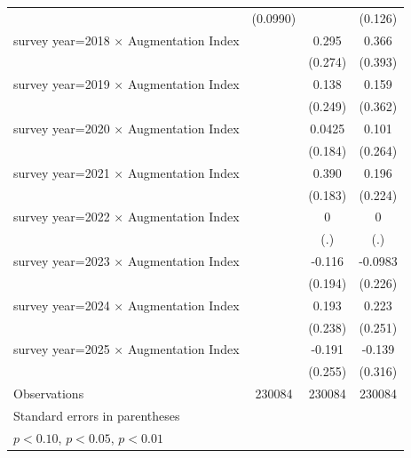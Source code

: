 \begin{table}[htbp]
\begin{tabular}{l*{3}{c}}
                    &    (0.0990)         &                     &     (0.126)         \\
\addlinespace
survey year=2018 $\times$ Augmentation Index&                     &       0.295         &       0.366         \\
                    &                     &     (0.274)         &     (0.393)         \\
\addlinespace
survey year=2019 $\times$ Augmentation Index&                     &       0.138         &       0.159         \\
                    &                     &     (0.249)         &     (0.362)         \\
\addlinespace
survey year=2020 $\times$ Augmentation Index&                     &      0.0425         &       0.101         \\
                    &                     &     (0.184)         &     (0.264)         \\
\addlinespace
survey year=2021 $\times$ Augmentation Index&                     &       0.390\sym{**} &       0.196         \\
                    &                     &     (0.183)         &     (0.224)         \\
\addlinespace
survey year=2022 $\times$ Augmentation Index&                     &           0         &           0         \\
                    &                     &         (.)         &         (.)         \\
\addlinespace
survey year=2023 $\times$ Augmentation Index&                     &      -0.116         &     -0.0983         \\
                    &                     &     (0.194)         &     (0.226)         \\
\addlinespace
survey year=2024 $\times$ Augmentation Index&                     &       0.193         &       0.223         \\
                    &                     &     (0.238)         &     (0.251)         \\
\addlinespace
survey year=2025 $\times$ Augmentation Index&                     &      -0.191         &      -0.139         \\
                    &                     &     (0.255)         &     (0.316)         \\
\midrule
Observations        &      230084         &      230084         &      230084         \\
\bottomrule
\multicolumn{4}{l}{\footnotesize Standard errors in parentheses}\\
\multicolumn{4}{l}{\footnotesize \sym{*} \(p<0.10\), \sym{**} \(p<0.05\), \sym{***} \(p<0.01\)}\\
\end{tabular}
\end{table}
